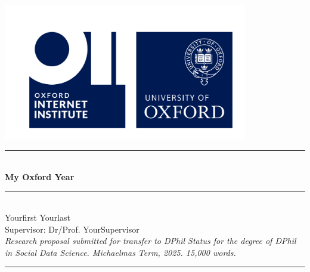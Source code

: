 \newcommand{\HRule}{\rule{\linewidth}{0.2mm}}

\begin{titlepage}
\begin{center}

\includegraphics[width=0.8\textwidth]{figures/OII_logo.png}
\vspace{10mm}

\HRule \\[0.4cm]
{\LARGE \textbf{My Oxford Year}\\[0.4cm]}
\HRule \\[0.5cm]

\vfill
{\Large Yourfirst Yourlast} \\[0.3cm]
{\large Supervisor: Dr/Prof. YourSupervisor} \\[3.25cm]


\textit{Research proposal submitted for transfer to DPhil Status for the degree of DPhil in Social Data Science. Michaelmas Term, 2025. 15,000 words.} \\[0.2cm]


\rule{\linewidth}{0.2mm}

\end{center}
\end{titlepage}
